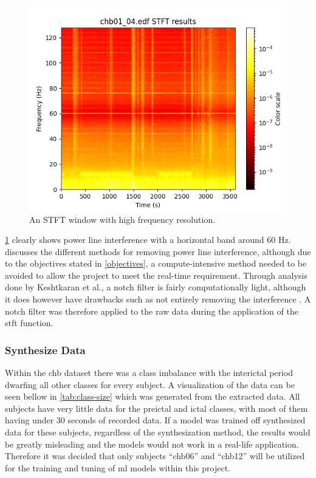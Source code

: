 \documentclass[12pt]{article}
\begin{document}
\begin{figure}[H]
\includegraphics[width=\textwidth]{stft1}
\centering
\caption{An STFT window with high frequency resolution.}
\label{fig:stft1}
\end{figure}

\ref{fig:stft1} clearly shows power line interference with a horizontal band around 60 Hz. \cite{keshtkaran2014fast} discusses the different methods for removing power line interference, although due to the objectives stated in \ref{objectives}, a compute-intensive method needed to be avoided to allow the project to meet the real-time requirement. Through analysis done by Keshtkaran et al., a notch filter is fairly computationally light, although it does however have drawbacks such as not entirely removing the interference \cite{keshtkaran2014fast}. A notch filter was therefore applied to the raw data during the application of the \acrshort{stft} function.


\subsubsection{Synthesize Data}\label{synthesize-data}

Within the \acrshort{chb} dataset there was a class imbalance with the interictal period dwarfing all other classes for every subject. A visualization of the data can be seen bellow in \ref{tab:class-size} which was generated from the extracted data. All subjects have very little data for the preictal and ictal classes, with most of them having under 30 seconds of recorded data. If a model was trained off synthesized data for these subjects, regardless of the synthesization method, the results would be greatly misleading and the models would not work in a real-life application. Therefore it was decided that only subjects ``chb06'' and ``chb12'' will be utilized for the training and tuning of \acrshort{ml} models within this project.
\end{document}
